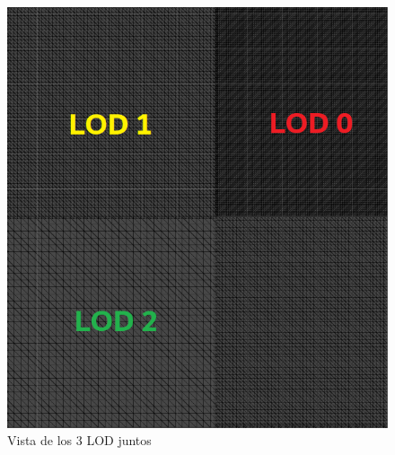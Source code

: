 \begin{itemize}
\begin{figure}[h]
\begin{minipage}{0.45\textwidth}
            \includegraphics[width=\textwidth]{img/codes/3LOD.png}
            \caption{Vista de los 3 LOD juntos}
        \end{minipage}
    \end{figure}


\end{itemize}
